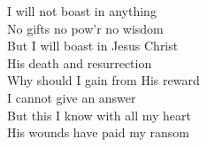 \documentclass{beamer}
\begin{document}
{\begin{frame}{}
\end{frame}

\hypertarget{How deep the Father's love for us[](Townend)3}{}
\begin{frame}{}
\fontsize{ 18 }{ 23 }\selectfont

I will not boast in anything\\ 
No gifts no pow’r no wisdom\\ 
But I will boast in Jesus Christ\\ 
His death and resurrection\\ 
Why should I gain from His reward\\ 
I cannot give an answer\\ 
But this I know with all my heart\\ 
His wounds have paid my ransom 

\end{frame}

}
\end{document}
